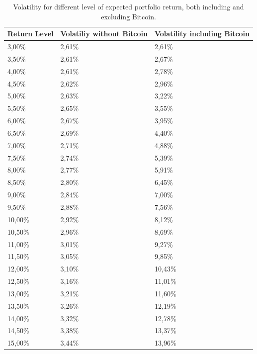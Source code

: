 \begin{table}
\begin{tabular}{lll}
	\toprule
	Return Level & Volatiliy without Bitcoin & Volatility including Bitcoin \\
	\midrule
	3,00\% & 2,61\% & 2,61\% \\
	3,50\% & 2,61\% & 2,67\% \\
	4,00\% & 2,61\% & 2,78\% \\
	4,50\% & 2,62\% & 2,96\% \\
	5,00\% & 2,63\% & 3,22\% \\
	5,50\% & 2,65\% & 3,55\% \\
	6,00\% & 2,67\% & 3,95\% \\
	6,50\% & 2,69\% & 4,40\% \\
	7,00\% & 2,71\% & 4,88\% \\
	7,50\% & 2,74\% & 5,39\% \\
	8,00\% & 2,77\% & 5,91\% \\
	8,50\% & 2,80\% & 6,45\% \\
	9,00\% & 2,84\% & 7,00\% \\
	9,50\% & 2,88\% & 7,56\% \\
	10,00\% & 2,92\% & 8,12\% \\
	10,50\% & 2,96\% & 8,69\% \\
	11,00\% & 3,01\% & 9,27\% \\
	11,50\% & 3,05\% & 9,85\% \\
	12,00\% & 3,10\% & 10,43\% \\
	12,50\% & 3,16\% & 11,01\% \\
	13,00\% & 3,21\% & 11,60\% \\
	13,50\% & 3,26\% & 12,19\% \\
	14,00\% & 3,32\% & 12,78\% \\
	14,50\% & 3,38\% & 13,37\% \\
	15,00\% & 3,44\% & 13,96\% \\
	\bottomrule
\end{tabular}
\caption{Volatility for different level of expected portfolio return, both including and excluding Bitcoin.}
\label{tab:markowitz_vol_on_ret}
\end{table}


